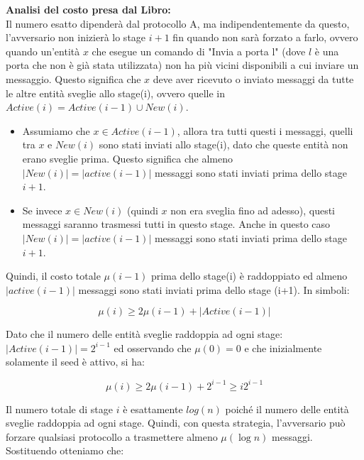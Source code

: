 \textbf{Analisi del costo presa dal Libro:}\\
Il numero esatto dipenderà dal protocollo A, ma indipendentemente da questo,
l'avversario non inizierà lo stage $i+1$ fin quando non sarà forzato a farlo,
ovvero quando un'entità $x$ che esegue un comando di "Invia a porta l" (dove $l$
è una porta che non è già stata utilizzata) non ha più vicini disponibili a cui
inviare un messaggio. Questo significa che $x$ deve aver ricevuto o inviato
messaggi da tutte le altre entità sveglie allo stage(i), ovvero quelle in
$Active(i) = Active(i-1) \cup New (i)$.

\begin{itemize}
    \item Assumiamo che $x \in Active(i-1)$, allora tra tutti questi i messaggi,
          quelli tra $x$ e $New(i)$ sono stati inviati allo stage(i), dato che queste
          entità non erano sveglie prima. Questo significa che almeno
          $|New(i)|=|active(i-1)|$ messaggi sono stati inviati prima dello stage $i+1$.
    \item Se invece $x \in New(i)$ (quindi $x$ non era sveglia fino ad adesso),
          questi messaggi saranno trasmessi tutti in questo stage. Anche in questo caso
          $|New(i)|=|active(i-1)|$ messaggi sono stati inviati prima dello stage $i+1$.
\end{itemize}

Quindi, il costo totale $\mu(i-1)$ prima dello stage(i) è raddoppiato ed almeno
$|active(i-1)|$ messaggi sono stati inviati prima dello stage (i+1). In simboli:


$$\mu(i) \geq 2\mu(i-1) + |Active(i-1)|$$

Dato che il numero delle entità sveglie raddoppia ad ogni stage: $|Active(i-1)|
    = 2^{i-1}$ ed osservando che $\mu(0) = 0$ e che inizialmente solamente il seed è
attivo, si ha:

$$\mu(i) \geq 2\mu(i-1)+2^{i-1} \geq i2^{i-1}$$

Il numero totale di stage $i$ è esattamente $log(n)$ poiché il numero delle
entità sveglie raddoppia ad ogni stage. Quindi, con questa strategia,
l'avversario può forzare qualsiasi protocollo a trasmettere almeno $\mu(\log n)$
messaggi. Sostituendo otteniamo che:

